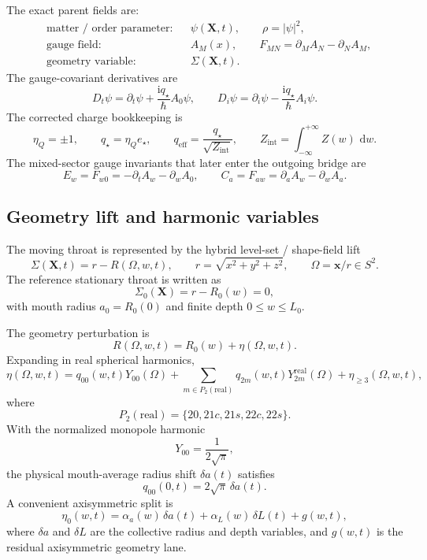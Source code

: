 \documentclass[11pt]{article}
\theoremstyle{definition}
\newcommand{\dd}{\,\mathrm{d}}
\newcommand{\ii}{\mathrm{i}}
\newcommand{\eff}{\mathrm{eff}}
\begin{document}
The exact parent fields are:
\begin{align*}
&\text{matter / order parameter:} && \psi(\mathbf X,t),\qquad \rho=|\psi|^2,\\
&\text{gauge field:} && A_M(x),\qquad F_{MN}=\partial_MA_N-\partial_NA_M,\\
&\text{geometry variable:} && \Sigma(\mathbf X,t).
\end{align*}
The gauge-covariant derivatives are
\[
D_t\psi=\partial_t\psi+\frac{\ii q_\star}{\hbar}A_0\psi,
\qquad
D_i\psi=\partial_i\psi-\frac{\ii q_\star}{\hbar}A_i\psi.
\]
The corrected charge bookkeeping is
\[
\eta_Q=\pm1,
\qquad
q_\star=\eta_Q e_\star,
\qquad
q_{\eff}=\frac{q_\star}{\sqrt{Z_{\mathrm{int}}}},
\qquad
Z_{\mathrm{int}}=\int_{-\infty}^{+\infty} Z(w)\,\dd w.
\]
The mixed-sector gauge invariants that later enter the outgoing bridge are
\[
E_w=F_{w0}=-\partial_tA_w-\partial_wA_0,
\qquad
C_a=F_{aw}=\partial_aA_w-\partial_wA_a.
\]

\subsection{Geometry lift and harmonic variables}

The moving throat is represented by the hybrid level-set / shape-field lift
\[
\Sigma(\mathbf X,t)=r-R(\Omega,w,t),
\qquad
r=\sqrt{x^2+y^2+z^2},
\qquad
\Omega=\mathbf x/r\in S^2.
\]
The reference stationary throat is written as
\[
\Sigma_0(\mathbf X)=r-R_0(w)=0,
\]
with mouth radius $a_0=R_0(0)$ and finite depth $0\leq w\leq L_0$.

The geometry perturbation is
\[
R(\Omega,w,t)=R_0(w)+\eta(\Omega,w,t).
\]
Expanding in real spherical harmonics,
\begin{equation}
\eta(\Omega,w,t)
=
q_{00}(w,t)Y_{00}(\Omega)
+
\sum_{m\in P_2(\mathrm{real})} q_{2m}(w,t)Y_{2m}^{\mathrm{real}}(\Omega)
+
\eta_{\ge 3}(\Omega,w,t),
\label{eq:appendix-eta-expansion}
\end{equation}
where
\[
P_2(\mathrm{real})=\{20,21c,21s,22c,22s\}.
\]
With the normalized monopole harmonic
\[
Y_{00}=\frac{1}{2\sqrt\pi},
\]
the physical mouth-average radius shift $\delta a(t)$ satisfies
\begin{equation}
q_{00}(0,t)=2\sqrt\pi\,\delta a(t).
\label{eq:appendix-q00-deltaa}
\end{equation}
A convenient axisymmetric split is
\[
\eta_0(w,t)=\alpha_a(w)\,\delta a(t)+\alpha_L(w)\,\delta L(t)+g(w,t),
\]
where $\delta a$ and $\delta L$ are the collective radius and depth variables, and $g(w,t)$ is the residual axisymmetric geometry lane.
\end{document}
